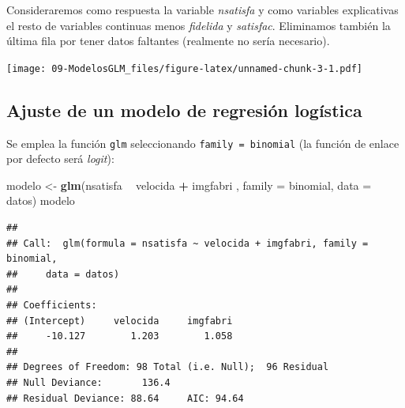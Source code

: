 \documentclass[]{book}
\newenvironment{Shaded}{\begin{snugshade}}{\end{snugshade}}
\newcommand{\DataTypeTok}[1]{\textcolor[rgb]{0.13,0.29,0.53}{#1}}
\newcommand{\DecValTok}[1]{\textcolor[rgb]{0.00,0.00,0.81}{#1}}
\newcommand{\KeywordTok}[1]{\textcolor[rgb]{0.13,0.29,0.53}{\textbf{#1}}}
\newcommand{\NormalTok}[1]{#1}
\newcommand{\OperatorTok}[1]{\textcolor[rgb]{0.81,0.36,0.00}{\textbf{#1}}}
\newcommand{\StringTok}[1]{\textcolor[rgb]{0.31,0.60,0.02}{#1}}
\begin{document}
Consideraremos como respuesta la variable \emph{nsatisfa} y como variables explicativas
el resto de variables continuas menos \emph{fidelida} y \emph{satisfac}.
Eliminamos también la última fila por tener datos faltantes (realmente no sería necesario).

\begin{Shaded}
\end{Shaded}

\texttt{[image: 09-ModelosGLM\_files/figure-latex/unnamed-chunk-3-1.pdf]}

\hypertarget{ajuste-de-un-modelo-de-regresion-logistica}{%
\subsection{Ajuste de un modelo de regresión logística}\label{ajuste-de-un-modelo-de-regresion-logistica}}

Se emplea la función \texttt{glm} seleccionando \texttt{family\ =\ binomial} (la función de enlace por defecto será \emph{logit}):

\begin{Shaded}
\begin{Highlighting}[]
\NormalTok{modelo <-}\StringTok{ }\KeywordTok{glm}\NormalTok{(nsatisfa }\OperatorTok{~}\StringTok{ }\NormalTok{velocida }\OperatorTok{+}\StringTok{ }\NormalTok{imgfabri , }\DataTypeTok{family =}\NormalTok{ binomial, }\DataTypeTok{data =}\NormalTok{ datos)}
\NormalTok{modelo}
\end{Highlighting}
\end{Shaded}

\begin{verbatim}
## 
## Call:  glm(formula = nsatisfa ~ velocida + imgfabri, family = binomial, 
##     data = datos)
## 
## Coefficients:
## (Intercept)     velocida     imgfabri  
##     -10.127        1.203        1.058  
## 
## Degrees of Freedom: 98 Total (i.e. Null);  96 Residual
## Null Deviance:       136.4 
## Residual Deviance: 88.64     AIC: 94.64
\end{verbatim}
\end{document}
